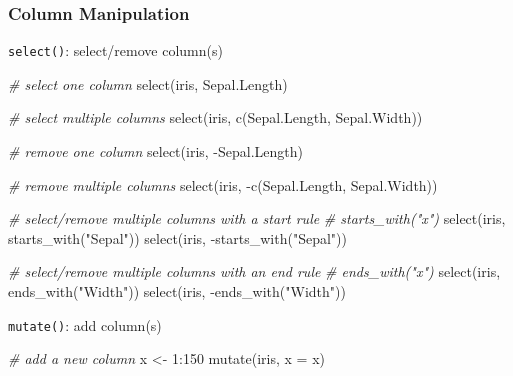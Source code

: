\documentclass[
]{article}
\newenvironment{Shaded}{\begin{snugshade}}{\end{snugshade}}
\newcommand{\AttributeTok}[1]{\textcolor[rgb]{0.77,0.63,0.00}{#1}}
\newcommand{\CommentTok}[1]{\textcolor[rgb]{0.56,0.35,0.01}{\textit{#1}}}
\newcommand{\DecValTok}[1]{\textcolor[rgb]{0.00,0.00,0.81}{#1}}
\newcommand{\FunctionTok}[1]{\textcolor[rgb]{0.00,0.00,0.00}{#1}}
\newcommand{\NormalTok}[1]{#1}
\newcommand{\OtherTok}[1]{\textcolor[rgb]{0.56,0.35,0.01}{#1}}
\newcommand{\SpecialCharTok}[1]{\textcolor[rgb]{0.00,0.00,0.00}{#1}}
\newcommand{\StringTok}[1]{\textcolor[rgb]{0.31,0.60,0.02}{#1}}
\begin{document}
\hypertarget{column-manipulation}{%
\subsubsection{Column Manipulation}\label{column-manipulation}}

\texttt{select()}: select/remove column(s)

\begin{Shaded}
\begin{Highlighting}[]
\CommentTok{\# select one column}
\FunctionTok{select}\NormalTok{(iris, Sepal.Length)}

\CommentTok{\# select multiple columns}
\FunctionTok{select}\NormalTok{(iris, }\FunctionTok{c}\NormalTok{(Sepal.Length, Sepal.Width))}

\CommentTok{\# remove one column}
\FunctionTok{select}\NormalTok{(iris, }\SpecialCharTok{{-}}\NormalTok{Sepal.Length)}

\CommentTok{\# remove multiple columns}
\FunctionTok{select}\NormalTok{(iris, }\SpecialCharTok{{-}}\FunctionTok{c}\NormalTok{(Sepal.Length, Sepal.Width))}

\CommentTok{\# select/remove multiple columns with a start rule}
\CommentTok{\# starts\_with("x")}
\FunctionTok{select}\NormalTok{(iris, }\FunctionTok{starts\_with}\NormalTok{(}\StringTok{"Sepal"}\NormalTok{))}
\FunctionTok{select}\NormalTok{(iris, }\SpecialCharTok{{-}}\FunctionTok{starts\_with}\NormalTok{(}\StringTok{"Sepal"}\NormalTok{))}

\CommentTok{\# select/remove multiple columns with an end rule}
\CommentTok{\# ends\_with("x")}
\FunctionTok{select}\NormalTok{(iris, }\FunctionTok{ends\_with}\NormalTok{(}\StringTok{"Width"}\NormalTok{))}
\FunctionTok{select}\NormalTok{(iris, }\SpecialCharTok{{-}}\FunctionTok{ends\_with}\NormalTok{(}\StringTok{"Width"}\NormalTok{))}
\end{Highlighting}
\end{Shaded}

\texttt{mutate()}: add column(s)

\begin{Shaded}
\begin{Highlighting}[]
\CommentTok{\# add a new column}
\NormalTok{x }\OtherTok{\textless{}{-}} \DecValTok{1}\SpecialCharTok{:}\DecValTok{150}
\FunctionTok{mutate}\NormalTok{(iris, }\AttributeTok{x =}\NormalTok{ x)}
\end{Highlighting}
\end{Shaded}
\end{document}
